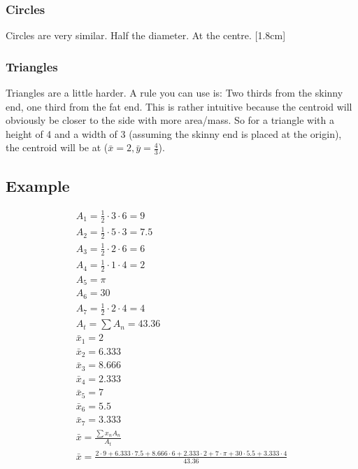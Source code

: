 \documentclass[a4paper, 12pt]{article}
\begin{document}
\subsubsection{Circles}
Circles are very similar. Half the diameter. At the centre.
[1.8cm]
\subsubsection{Triangles}
Triangles are a little harder. 
A rule you can use is:
Two thirds from the skinny end, one third from the fat end. 
This is rather  intuitive because the centroid will obviously be closer to the side with more area/mass. 
So for a triangle with a height of 4 and a width of 3 (assuming the skinny end is placed at the origin),
the centroid will be at ($\bar{x}=2,\bar{y}=\frac{4}{3}$).

\subsection{Example}
\begin{example*}
\begin{equation*}
\begin{gathered}
    A_1 = \frac{1}{2} \cdot 3 \cdot 6 = 9\\
    A_2 = \frac{1}{2} \cdot 5 \cdot 3 = 7.5\\
    A_3 = \frac{1}{2} \cdot 2 \cdot 6 = 6\\
    A_4 = \frac{1}{2} \cdot 1 \cdot 4 = 2\\
    A_5 = \pi \\ 
    A_6 = 30 \\ 
    A_7 = \frac{1}{2} \cdot 2 \cdot 4 = 4\\
    A_t = \sum A_n = 43.36\\ 
    \bar{x}_1 = 2 \\
    \bar{x}_2 = 6.333 \\
    \bar{x}_3 = 8.666 \\
    \bar{x}_4 = 2.333 \\
    \bar{x}_5 = 7 \\
    \bar{x}_6 = 5.5 \\
    \bar{x}_7 = 3.333 \\
    \bar{x} = \frac{\sum x_n A_n}{A_t} \\
    \bar{x} = \frac{2 \cdot 9 + 6.333 \cdot 7.5 + 8.666 \cdot 6 + 2.333 \cdot 2 + 7 \cdot \pi + 30 \cdot 5.5 + 3.333 \cdot 4}{43.36} \\
\end{gathered}
\end{equation*}
\end{example*}
\end{document}
